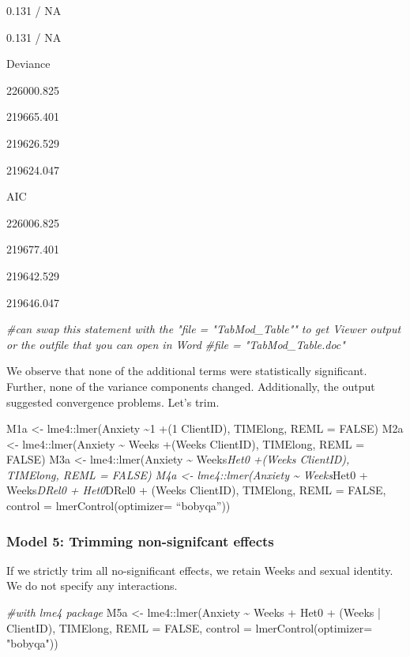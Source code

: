 \documentclass[
  11pt,
]{book}
\newenvironment{Shaded}{\begin{snugshade}}{\end{snugshade}}
\newcommand{\AttributeTok}[1]{\textcolor[rgb]{0.77,0.63,0.00}{#1}}
\newcommand{\CommentTok}[1]{\textcolor[rgb]{0.56,0.35,0.01}{\textit{#1}}}
\newcommand{\ConstantTok}[1]{\textcolor[rgb]{0.00,0.00,0.00}{#1}}
\newcommand{\FunctionTok}[1]{\textcolor[rgb]{0.00,0.00,0.00}{#1}}
\newcommand{\NormalTok}[1]{#1}
\newcommand{\OtherTok}[1]{\textcolor[rgb]{0.56,0.35,0.01}{#1}}
\newcommand{\SpecialCharTok}[1]{\textcolor[rgb]{0.00,0.00,0.00}{#1}}
\newcommand{\StringTok}[1]{\textcolor[rgb]{0.31,0.60,0.02}{#1}}
\begin{document}
0.131 / NA

0.131 / NA

Deviance

226000.825

219665.401

219626.529

219624.047

AIC

226006.825

219677.401

219642.529

219646.047

\begin{Shaded}
\begin{Highlighting}[]
\CommentTok{\#can swap this statement with the "file = "TabMod\_Table"" to get Viewer output or the outfile that you can open in Word}
\CommentTok{\#file = "TabMod\_Table.doc"}
\end{Highlighting}
\end{Shaded}

We observe that none of the additional terms were statistically significant. Further, none of the variance components changed. Additionally, the output suggested convergence problems. Let's trim.

M1a \textless- lme4::lmer(Anxiety \textasciitilde1 +(1 \textbar{} ClientID), TIMElong, REML = FALSE)
M2a \textless- lme4::lmer(Anxiety \textasciitilde{} Weeks +(Weeks \textbar{} ClientID), TIMElong, REML = FALSE)
M3a \textless- lme4::lmer(Anxiety \textasciitilde{} Weeks\emph{Het0 +(Weeks \textbar{} ClientID), TIMElong, REML = FALSE)
M4a \textless- lme4::lmer(Anxiety \textasciitilde{} Weeks}Het0 + Weeks\emph{DRel0 + Het0}DRel0 + (Weeks \textbar{} ClientID), TIMElong, REML = FALSE, control = lmerControl(optimizer= ``bobyqa''))

\hypertarget{model-5-trimming-non-signifcant-effects}{%
\subsubsection{Model 5: Trimming non-signifcant effects}\label{model-5-trimming-non-signifcant-effects}}

If we strictly trim all no-significant effects, we retain Weeks and sexual identity. We do not specify any interactions.

\begin{Shaded}
\begin{Highlighting}[]
\CommentTok{\#with lme4 package}
\NormalTok{M5a }\OtherTok{\textless{}{-}}\NormalTok{ lme4}\SpecialCharTok{::}\FunctionTok{lmer}\NormalTok{(Anxiety }\SpecialCharTok{\textasciitilde{}}\NormalTok{ Weeks }\SpecialCharTok{+}\NormalTok{ Het0 }\SpecialCharTok{+}\NormalTok{ (Weeks }\SpecialCharTok{|}\NormalTok{ ClientID), TIMElong, }\AttributeTok{REML =} \ConstantTok{FALSE}\NormalTok{, }\AttributeTok{control =} \FunctionTok{lmerControl}\NormalTok{(}\AttributeTok{optimizer=} \StringTok{"bobyqa"}\NormalTok{))}
\end{Highlighting}
\end{Shaded}
\end{document}
